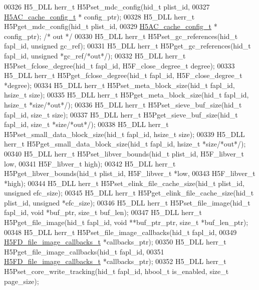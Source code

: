 \begin{DoxyCode}
00326 H5\_DLL herr\_t H5Pset\_mdc\_config(hid\_t    plist\_id,
00327        \hyperlink{struct_h5_a_c__cache__config__t}{H5AC\_cache\_config\_t} * config\_ptr);
00328 H5\_DLL herr\_t H5Pget\_mdc\_config(hid\_t     plist\_id,
00329        \hyperlink{struct_h5_a_c__cache__config__t}{H5AC\_cache\_config\_t} * config\_ptr);    \textcolor{comment}{/* out */}
00330 H5\_DLL herr\_t H5Pset\_gc\_references(hid\_t fapl\_id, \textcolor{keywordtype}{unsigned} gc\_ref);
00331 H5\_DLL herr\_t H5Pget\_gc\_references(hid\_t fapl\_id, \textcolor{keywordtype}{unsigned} *gc\_ref\textcolor{comment}{/*out*/});
00332 H5\_DLL herr\_t H5Pset\_fclose\_degree(hid\_t fapl\_id, H5F\_close\_degree\_t degree);
00333 H5\_DLL herr\_t H5Pget\_fclose\_degree(hid\_t fapl\_id, H5F\_close\_degree\_t *degree);
00334 H5\_DLL herr\_t H5Pset\_meta\_block\_size(hid\_t fapl\_id, hsize\_t size);
00335 H5\_DLL herr\_t H5Pget\_meta\_block\_size(hid\_t fapl\_id, hsize\_t *size\textcolor{comment}{/*out*/});
00336 H5\_DLL herr\_t H5Pset\_sieve\_buf\_size(hid\_t fapl\_id, \textcolor{keywordtype}{size\_t} size);
00337 H5\_DLL herr\_t H5Pget\_sieve\_buf\_size(hid\_t fapl\_id, \textcolor{keywordtype}{size\_t} *size\textcolor{comment}{/*out*/});
00338 H5\_DLL herr\_t H5Pset\_small\_data\_block\_size(hid\_t fapl\_id, hsize\_t size);
00339 H5\_DLL herr\_t H5Pget\_small\_data\_block\_size(hid\_t fapl\_id, hsize\_t *size\textcolor{comment}{/*out*/});
00340 H5\_DLL herr\_t H5Pset\_libver\_bounds(hid\_t plist\_id, H5F\_libver\_t low,
00341     H5F\_libver\_t high);
00342 H5\_DLL herr\_t H5Pget\_libver\_bounds(hid\_t plist\_id, H5F\_libver\_t *low,
00343     H5F\_libver\_t *high);
00344 H5\_DLL herr\_t H5Pset\_elink\_file\_cache\_size(hid\_t plist\_id, \textcolor{keywordtype}{unsigned} efc\_size);
00345 H5\_DLL herr\_t H5Pget\_elink\_file\_cache\_size(hid\_t plist\_id, \textcolor{keywordtype}{unsigned} *efc\_size);
00346 H5\_DLL herr\_t H5Pset\_file\_image(hid\_t fapl\_id, \textcolor{keywordtype}{void} *buf\_ptr, \textcolor{keywordtype}{size\_t} buf\_len);
00347 H5\_DLL herr\_t H5Pget\_file\_image(hid\_t fapl\_id, \textcolor{keywordtype}{void} **buf\_ptr\_ptr, \textcolor{keywordtype}{size\_t} *buf\_len\_ptr);
00348 H5\_DLL herr\_t H5Pset\_file\_image\_callbacks(hid\_t fapl\_id,
00349        \hyperlink{struct_h5_f_d__file__image__callbacks__t}{H5FD\_file\_image\_callbacks\_t} *callbacks\_ptr);
00350 H5\_DLL herr\_t H5Pget\_file\_image\_callbacks(hid\_t fapl\_id,
00351        \hyperlink{struct_h5_f_d__file__image__callbacks__t}{H5FD\_file\_image\_callbacks\_t} *callbacks\_ptr);
00352 H5\_DLL herr\_t H5Pset\_core\_write\_tracking(hid\_t fapl\_id, hbool\_t is\_enabled, \textcolor{keywordtype}{size\_t} page\_size);

\end{DoxyCode}
